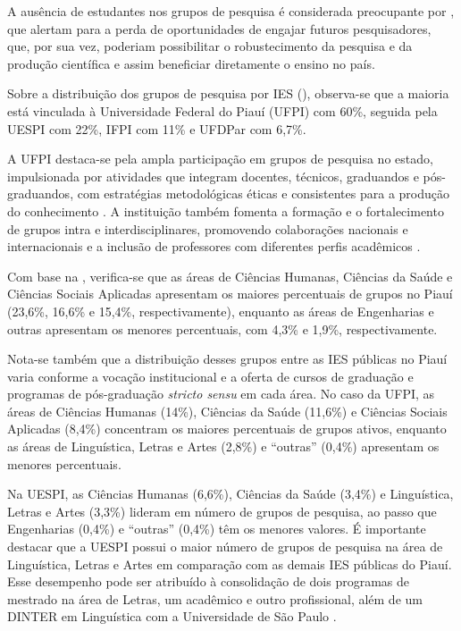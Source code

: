 \documentclass[portuguese]{textolivre}
\begin{document}
A ausência de estudantes nos grupos de pesquisa é considerada preocupante por \textcite{costa2014,erdmann2017}, que alertam para a perda de oportunidades de engajar futuros pesquisadores, que, por sua vez, poderiam possibilitar o robustecimento da pesquisa e da produção científica e assim beneficiar diretamente o ensino no país.

Sobre a distribuição dos grupos de pesquisa por IES (), observa-se que a maioria está vinculada à Universidade Federal do Piauí (UFPI) com 60\%, seguida pela UESPI com 22\%, IFPI com 11\% e UFDPar com 6,7\%.

A UFPI destaca-se pela ampla participação em grupos de pesquisa no estado, impulsionada por atividades que integram docentes, técnicos, graduandos e pós-graduandos, com estratégias metodológicas éticas e consistentes para a produção do conhecimento \cite{ufpi2020pdi}. A instituição também fomenta a formação e o fortalecimento de grupos intra e interdisciplinares, promovendo colaborações nacionais e internacionais e a inclusão de professores com diferentes perfis acadêmicos \cite{ufpi2020pdi}.

Com base na , verifica-se que as áreas de Ciências Humanas, Ciências da Saúde e Ciências Sociais Aplicadas apresentam os maiores percentuais de grupos no Piauí (23,6\%, 16,6\% e 15,4\%, respectivamente), enquanto as áreas de Engenharias e outras apresentam os menores percentuais, com 4,3\% e 1,9\%, respectivamente.

Nota-se também que a distribuição desses grupos entre as IES públicas no Piauí varia conforme a vocação institucional e a oferta de cursos de graduação e programas de pós-graduação \textit{stricto sensu} em cada área. No caso da UFPI, as áreas de Ciências Humanas (14\%), Ciências da Saúde (11,6\%) e Ciências Sociais Aplicadas (8,4\%) concentram os maiores percentuais de grupos ativos, enquanto as áreas de Linguística, Letras e Artes (2,8\%) e “outras” (0,4\%) apresentam os menores percentuais.

Na UESPI, as Ciências Humanas (6,6\%), Ciências da Saúde (3,4\%) e Linguística, Letras e Artes (3,3\%) lideram em número de grupos de pesquisa, ao passo que Engenharias (0,4\%) e “outras” (0,4\%) têm os menores valores. É importante destacar que a UESPI possui o maior número de grupos de pesquisa na área de Linguística, Letras e Artes em comparação com as demais IES públicas do Piauí. Esse desempenho pode ser atribuído à consolidação de dois programas de mestrado na área de Letras, um acadêmico e outro profissional, além de um DINTER em Linguística com a Universidade de São Paulo \cite{uespi2022pdi}.
\end{document}
